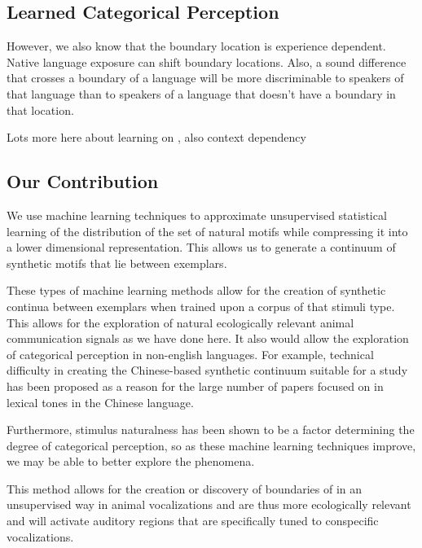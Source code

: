 \subsection{Learned Categorical Perception}

However, we also know that the boundary location is experience dependent. Native language exposure can shift boundary locations. Also, a sound difference that crosses a boundary of a language will be more discriminable to speakers of that language than to speakers of a language that doesn’t have a boundary in that location.

Lots more here about learning on \CP, also context dependency

\subsection{Our Contribution}
We use machine learning techniques to approximate unsupervised statistical learning of the distribution of the set of natural motifs while compressing it into a lower dimensional representation. This allows us to generate a continuum of synthetic motifs that lie between exemplars.

These types of machine learning methods allow for the creation of synthetic continua between exemplars when trained upon a corpus of that stimuli type. This allows for the exploration of natural ecologically relevant animal communication signals as we have done here. It also would allow the exploration of categorical perception in non-english languages. For example, technical difficulty in creating the Chinese-based synthetic continuum suitable for a \CP study has been proposed as a reason for the large number of papers focused on \CP in lexical tones in the Chinese language\cite{zhang2013categorical}.

Furthermore, stimulus naturalness has been shown to be a factor determining the degree of categorical perception, so as these machine learning techniques improve, we may be able to better explore the \CP phenomena.

This method allows for the creation or discovery of boundaries of \CP in an unsupervised way in animal vocalizations and are thus more ecologically relevant and will activate auditory regions that are specifically tuned to conspecific vocalizations.

